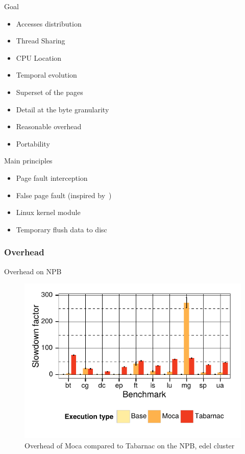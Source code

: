 \documentclass[xcolor={usenames,dvipsnames}]{beamer}
\begin{document}
\begin{frame}{Goal}
    \begin{itemize}[<+->]
        \item Accesses distribution
        \item Thread Sharing
        \item CPU Location
        \item \alert{Temporal evolution}
        \item \alert{Superset of the pages}
        \item Detail at the byte granularity
        \item Reasonable overhead
        \item \alert{Portability}
    \end{itemize}
\end{frame}

\begin{frame}{Main principles}
    \begin{itemize}[<+->]
        \item \alert{Page fault interception}
        \item False page fault (inspired by~\cite{Diener12Using})
        \item Linux kernel module
        \item Temporary flush data to disc
    \end{itemize}
\end{frame}

\subsubsection*{Overhead}

\begin{frame}{Overhead on NPB}
    \begin{figure}[]
        \centering
        \includegraphics[width=.7\linewidth]{moca_overhead_nas.pdf}
        \caption{Overhead of Moca compared to Tabarnac on the NPB, edel
        cluster}
    \end{figure}
\end{frame}
\end{document}
